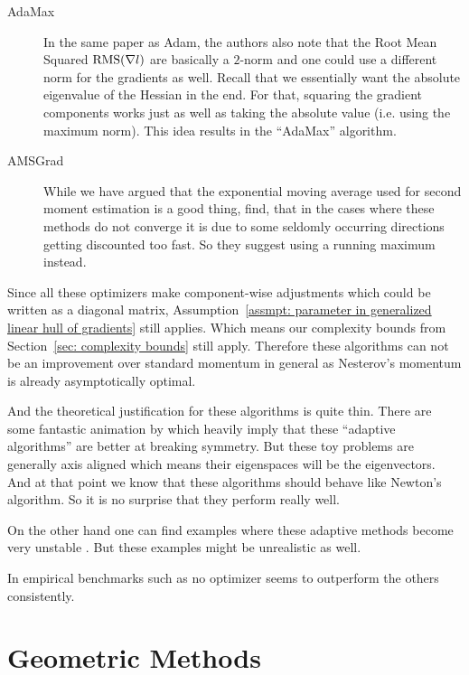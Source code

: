 \begin{description}
	\item[AdaMax] \parencite{kingmaAdamMethodStochastic2017} In the same paper
	as Adam, the authors also note that the Root Mean Squared
	\(\text{RMS}(\nabla l)\) are basically a \(2\)-norm and one could use a
	different norm for the gradients as well.  Recall that we essentially want
	the absolute eigenvalue of the Hessian in the end. For that, squaring
	the gradient components works just as well as taking the absolute value (i.e.
	using the maximum norm). This idea results in the ``AdaMax'' algorithm.

	\item[AMSGrad] \parencite{reddiConvergenceAdam2019} While we have argued that
	the exponential moving average used for second moment estimation is a good
	thing, \textcite{reddiConvergenceAdam2019} find, that in the cases where
	these methods do not converge it is due to some seldomly occurring directions
	getting discounted too fast. So they suggest using a running maximum instead.
\end{description}

Since all these optimizers make component-wise adjustments which could be written
as a diagonal matrix, Assumption~\ref{assmpt: parameter in generalized linear
hull of gradients} still applies. Which means our complexity bounds from
Section~\ref{sec: complexity bounds} still apply. Therefore these algorithms
can not be an improvement over standard momentum in general as Nesterov's
momentum is already asymptotically optimal.

And the theoretical justification for these algorithms is quite thin. There
are some fantastic animation by \textcite{radfordVisualizingOptimizationAlgos2014}
which heavily imply that these ``adaptive algorithms'' are better at breaking
symmetry. But these toy problems are generally axis aligned which means their
eigenspaces will be the eigenvectors. And at that point we know that these
algorithms should behave like Newton's algorithm. So it is no surprise that they
perform really well.

On the other hand one can find examples where these adaptive methods become very
unstable
\parencite[e.g.][]{wilsonMarginalValueAdaptive2018,reddiConvergenceAdam2019}.
But these examples might be unrealistic as well.

In empirical benchmarks such as \textcite{schmidtDescendingCrowdedValley2021} no
optimizer seems to outperform the others consistently.

\section{Geometric Methods}


